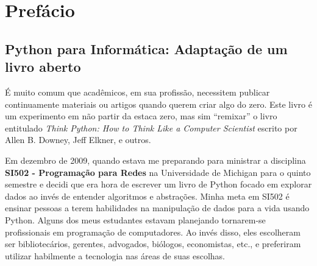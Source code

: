 
\chapter{Prefácio}

\section*{Python para Informática: Adaptação de um livro aberto}

É muito comum que acadêmicos, em sua profissão, necessitem publicar continuamente 
materiais ou artigos quando querem criar algo do zero. 
Este livro é um experimento em não partir da estaca zero, mas sim ``remixar''
o livro entitulado \emph{Think Python: How to Think Like
a Computer Scientist} escrito por Allen B. Downey, Jeff Elkner, e outros.

Em dezembro de 2009, quando estava me preparando para ministrar a disciplina
{\bf SI502 - Programação para Redes} na Universidade de Michigan
para o quinto semestre e decidi que era hora de escrever um livro de Python 
focado em explorar dados ao invés de entender algoritmos e 
abstrações.
Minha meta em SI502 é ensinar pessoas a terem habilidades na manipulação de dados 
para a vida usando Python.  Alguns dos meus estudantes estavam planejando tornarem-se 
profissionais em programação de computadores.  Ao invés disso, eles
escolheram ser bibliotecários, gerentes, advogados, biólogos, economistas, etc., 
e preferiram utilizar habilmente a tecnologia nas áreas de suas escolhas.


